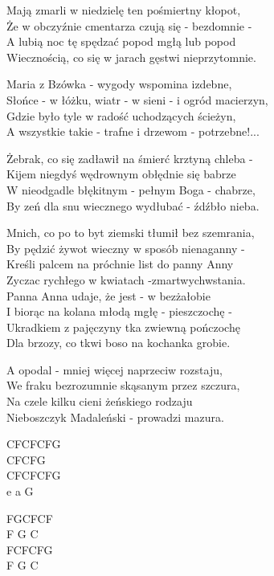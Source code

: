 \begin{text}
    Mają zmarli w niedzielę ten pośmiertny kłopot,\\
    Że w obczyźnie cmentarza czują się - bezdomnie -\\
    A lubią noc tę spędzać popod mgłą lub popod\\
    Wiecznością, co się w jarach gęstwi nieprzytomnie.

    Maria z Bzówka - wygody wspomina izdebne,\\
    Słońce - w łóżku, wiatr - w sieni - i ogród macierzyn,\\
    Gdzie było tyle w radość uchodzących ścieżyn,\\
    A wszystkie takie - trafne i drzewom - potrzebne!...

    Żebrak, co się zadławił na śmierć krztyną chleba -\\
    Kijem niegdyś wędrownym obłędnie się babrze\\
    W nieodgadle błękitnym - pełnym Boga - chabrze,\\
    By zeń dla snu wiecznego wydłubać - źdźbło nieba.

    Mnich, co po to byt ziemski tłumił bez szemrania,\\
    By pędzić żywot wieczny w sposób nienaganny -\\
    Kreśli palcem na próchnie list do panny Anny\\
    Zyczac rychłego w kwiatach -zmartwychwstania.\\

    Panna Anna udaje, że jest - w bezżałobie\\
    I biorąc na kolana młodą mgłę - pieszczochę -\\
    Ukradkiem z pajęczyny tka zwiewną pończochę\\
    Dla brzozy, co tkwi boso na kochanka grobie.

    A opodal - mniej więcej naprzeciw rozstaju,\\
    We fraku bezrozumnie skąsanym przez szczura,\\
    Na czele kilku cieni żeńskiego rodzaju\\
    Nieboszczyk Madaleński - prowadzi mazura.
\end{text}
\begin{chord}
    CFCFCFG\\
    CFCFG\\
    CFCFCFG\\
    e a G

    FGCFCF\\
    F G C\\
    FCFCFG\\
    F G C
\end{chord}